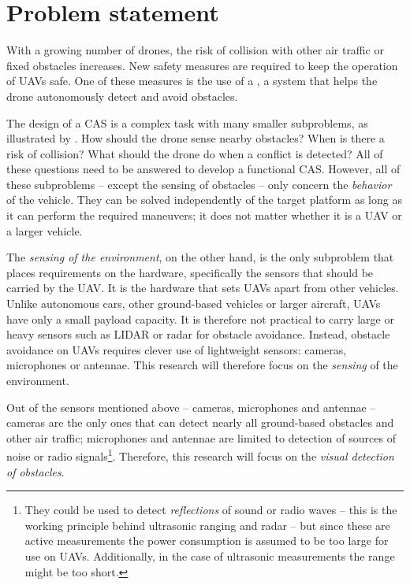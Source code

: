 \chapter{Problem statement}
\label{sec:thesis}
With a growing number of drones, the risk of collision with other air traffic or fixed obstacles increases.
New safety measures are required to keep the operation of \acp{UAV} safe.
One of these measures is the use of a , a system that helps the drone autonomously detect and avoid obstacles.

The design of a \acl{CAS} is a complex task with many smaller subproblems, as illustrated by \citeauthor{Albaker2009} \cite{Albaker2009}.
How should the drone sense nearby obstacles?
When is there a risk of collision?
What should the drone do when a conflict is detected?
All of these questions need to be answered to develop a functional \acl{CAS}.
However, all of these subproblems -- except the sensing of obstacles -- only concern the \emph{behavior} of the vehicle.
They can be solved independently of the target platform as long as it can perform the required maneuvers; it does not matter whether it is a \ac{UAV} or a larger vehicle.

The \emph{sensing of the environment}, on the other hand, is the only subproblem that places requirements on the hardware, specifically the sensors that should be carried by the \ac{UAV}.
It is the hardware that sets \acp{UAV} apart from other vehicles.
Unlike autonomous cars, other ground-based vehicles or larger aircraft, \acp{UAV} have only a small payload capacity.
It is therefore not practical to carry large or heavy sensors such as LIDAR or radar for obstacle avoidance.
Instead, obstacle avoidance on \acp{UAV} requires clever use of lightweight sensors: cameras, microphones or antennae.
This research will therefore focus on the \emph{sensing} of the environment.

Out of the sensors mentioned above -- cameras, microphones and antennae -- cameras are the only ones that can detect nearly all ground-based obstacles and other air traffic; microphones and antennae are limited to detection of sources of noise or radio signals\footnote{They could be used to detect \emph{reflections} of sound or radio waves -- this is the working principle behind ultrasonic ranging and radar -- but since these are active measurements the power consumption is assumed to be too large for use on \acp{UAV}. Additionally, in the case of ultrasonic measurements the range might be too short.}.
Therefore, this research will focus on the \emph{visual detection of obstacles}.

